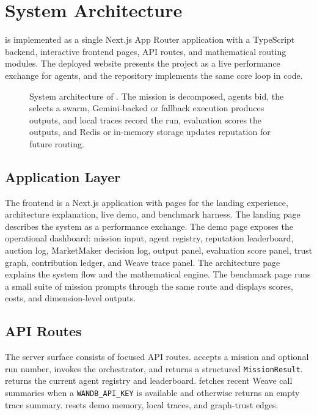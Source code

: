 \section{System Architecture}

\systemname{} is implemented as a single Next.js App Router application with a TypeScript backend, interactive frontend pages, API routes, and mathematical routing modules. The deployed website presents the project as a live performance exchange for agents, and the repository implements the same core loop in code.

\begin{figure}[t]
\centering
{}
\caption{System architecture of \systemname{}. The mission is decomposed, agents bid, the \marketmaker{} selects a swarm, Gemini-backed or fallback execution produces outputs, \weave{} and local traces record the run, evaluation scores the outputs, and Redis or in-memory storage updates reputation for future routing.}
\label{fig:architecture}
\end{figure}

\subsection{Application Layer}

The frontend is a Next.js application with pages for the landing experience, architecture explanation, live demo, and benchmark harness. The landing page describes the system as a performance exchange. The demo page exposes the operational dashboard: mission input, agent registry, reputation leaderboard, auction log, MarketMaker decision log, output panel, evaluation score panel, trust graph, contribution ledger, and Weave trace panel. The architecture page explains the system flow and the mathematical engine. The benchmark page runs a small suite of mission prompts through the same  route and displays scores, costs, and dimension-level outputs.

\subsection{API Routes}

The server surface consists of focused API routes.  accepts a mission and optional run number, invokes the orchestrator, and returns a structured \texttt{MissionResult}.  returns the current agent registry and leaderboard.  fetches recent Weave call summaries when a \texttt{WANDB\_API\_KEY} is available and otherwise returns an empty trace summary.  resets demo memory, local traces, and graph-trust edges.

